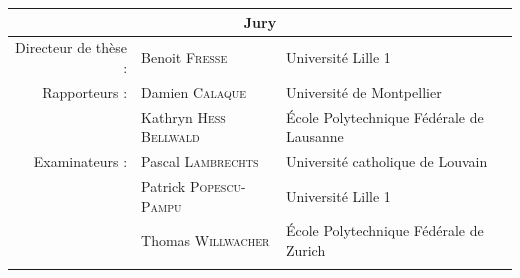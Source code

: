 \begin{titlepage}
\vfill
\large
\begin{center}
  \begin{tabular}{rll}
    \multicolumn{3}{c}{Jury} \\
    \midrule
Directeur de thèse : & Benoit \textsc{Fresse} & Université Lille 1\\
Rapporteurs : & Damien \textsc{Calaque} & Université de Montpellier\\
 & Kathryn \textsc{Hess Bellwald} & École Polytechnique Fédérale de Lausanne\\
Examinateurs : & Pascal \textsc{Lambrechts} & Université catholique de Louvain\\
 & Patrick \textsc{Popescu-Pampu} & Université Lille 1\\
 & Thomas \textsc{Willwacher} & École Polytechnique Fédérale de Zurich\\

  \end{tabular}
\end{center}
\end{titlepage}

\restoregeometry{}

